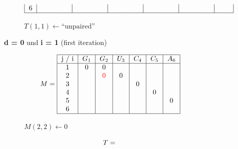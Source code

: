 \begin{figure}[H]
\begin{subfigure}[t]{0.65\textwidth}
\[\begin{tabular}{|c|c|c|c|c|c|c|}
                                    6 & \textcolor{white}{unpaired} & \textcolor{white}{unpaired} & \textcolor{white}{unpaired}
                                    & \textcolor{white}{unpaired}
                                    & \textcolor{white}{unpaired}
                                    & \textcolor{white}{init}
                                    \\ \hline
                        \end{tabular}
        \]
        \caption{$T(1,1) \gets \text{``unpaired''}$ }
    \end{subfigure}
    \caption{\textbf{d = 0} und \textbf{i = 1} (first iteration)}\label{fig:figure24}

\end{figure}

\begin{figure}[H]
    \centering
    \begin{subfigure}[t]{0.25\textwidth}
        \scriptsize \[
                        M =  \begin{tabular}{|c|c|c|c|c|c|c|}
                                 \hline
                                 j / i & $G_1$ & $G_2$              & $U_3$ & $C_4$ & $C_5$ & $A_6$ \\ \hline
                                 1     & 0     & 0                  &       &       &       &       \\
                                 2     &       & \textcolor{red}{0} & 0     &       &       &       \\
                                 3     &       &                    &       & 0     &       &       \\
                                 4     &       &                    &       &       & 0     &       \\
                                 5     &       &                    &       &       &       & 0     \\
                                 6     &       &                    &       &       &       &       \\ \hline
                        \end{tabular}
        \]
        \caption{$M(2,2) \gets 0$}
    \end{subfigure}
    \hfill
    \begin{subfigure}[t]{0.65\textwidth}
        \scriptsize \[
                        T =     \begin{tabular}{|c|c|c|c|c|c|c|}
                                    \hline

\end{tabular}\]
\end{subfigure}
\end{figure}
